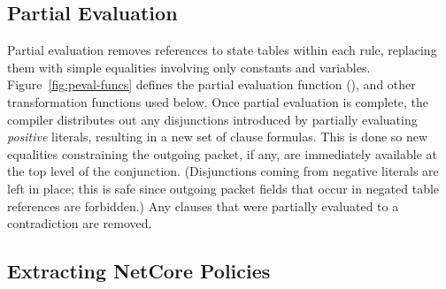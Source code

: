 \subsection{Partial Evaluation}
\label{sec:comp-partial}

Partial evaluation removes references to state
tables within each rule, replacing them with simple equalities involving
only constants and variables.
Figure~\ref{fig:peval-funcs} defines the partial evaluation function (\PE), and other transformation functions used below.
Once partial evaluation is complete, the compiler distributes out any disjunctions introduced by partially evaluating
\emph{positive} literals, resulting in a new set of clause formulas.
This is done so new equalities constraining the outgoing packet, if any, are
immediately available at the top level of the conjunction. (Disjunctions
coming from negative literals are left in place; this is safe since 
outgoing packet fields that occur in negated table references are forbidden.) 
Any clauses that were partially evaluated to a contradiction are removed. 

\subsection{Extracting NetCore Policies}
\label{sec:comp-policy}

